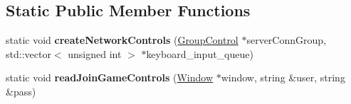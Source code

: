 \subsection*{Static Public Member Functions}
\begin{DoxyCompactItemize}
\item 
static void {\bfseries create\+Network\+Controls} (\hyperlink{classGroupControl}{Group\+Control} $\ast$server\+Conn\+Group, std\+::vector$<$ unsigned int $>$ $\ast$keyboard\+\_\+input\+\_\+queue)\hypertarget{classGameMenu_af17a4dfecd7c3da6e7c56e6af514bf50}{}\label{classGameMenu_af17a4dfecd7c3da6e7c56e6af514bf50}

\item 
static void {\bfseries read\+Join\+Game\+Controls} (\hyperlink{classWindow}{Window} $\ast$window, string \&user, string \&pass)\hypertarget{classGameMenu_a9cdbeb2ac09e3df2fe5d47e63d8063b1}{}\label{classGameMenu_a9cdbeb2ac09e3df2fe5d47e63d8063b1}

\end{DoxyCompactItemize}

